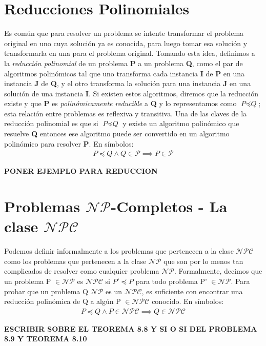 \documentclass{article}
\begin{document}
\section*{Reducciones Polinomiales}
\indent Es común que para resolver un problema se intente transformar el problema original en uno cuya solución ya es conocida, para luego tomar esa solución y transformarla en una para el problema original. Tomando esta idea, definimos a la \textit{reducción polinomial} de un problema \textbf{P} a un problema \textbf{Q}, como el par de algoritmos polinómicos tal que uno transforma cada instancia \textbf{I} de \textbf{P} en una instancia \textbf{J} de \textbf{Q}, y el otro transforma la solución para una instancia \textbf{J} en una solución de una instancia \textbf{I}. Si existen estos algoritmos, diremos que la reducción existe y que \textbf{P} es \textit{polinómicamente reducible} a \textbf{Q} y lo representamos como $\textit{P} \preceq \textit{Q}$; esta relación entre problemas es reflexiva y transitiva.\newline
\indent Una de las claves de la reducción polinomial es que si $\textit{P} \preceq \textit{Q}$ y existe un algoritmo polinómico que resuelve \textbf{Q} entonces ese algoritmo puede ser convertido en un algoritmo polinómico para resolver \textbf{P}. En símbolos:
\begin{align*}
    \textit{P} \preceq \textit{Q} \land \textit{Q} \in \mathcal{P} \implies \textit{P} \in \mathcal{P}
\end{align*}


\textbf{PONER EJEMPLO PARA REDUCCION}
\newline

\section*{Problemas $\mathcal{NP}$-Completos  -   La clase $\mathcal{NPC}$}
\indent Podemos definir informalmente a los problemas que pertenecen a la clase $\mathcal{NPC}$ como los problemas que pertenecen a la clase $\mathcal{NP}$ que son por lo menos tan complicados de resolver como cualquier problema $\mathcal{NP}$. Formalmente, decimos que un problema P $\in \mathcal{NP}$ es $\mathcal{NPC}$ si $P' \preceq P$ para todo problema P' $\in \mathcal{NP}$.\newline
\indent Para probar que un problema Q $\mathcal{NP}$ es un $\mathcal{NPC}$, es suficiente con encontrar una reducción polinómica de Q a algún P $\in \mathcal{NPC}$ conocido. En símbolos:
\begin{align*}
    \textit{P} \preceq \textit{Q} \land \textit{P} \in \mathcal{NPC} \implies \textit{Q}\in   \mathcal{NPC}
\end{align*}

\textbf{ESCRIBIR SOBRE EL TEOREMA 8.8 Y SI O SI DEL PROBLEMA 8.9 Y TEOREMA 8.10}
\end{document}

